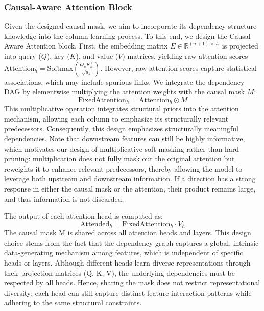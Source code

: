 \documentclass[conference]{IEEEtran}
\newcommand{\icde}[1]{{\color{black}#1}}
\newcommand{\rl}[1]{{\color{black}#1}}
\newcommand{\sydesi}[1]{{\color{black}#1}}
\newcommand{\syadd}[1]{{\color{black}#1}}
\newcommand{\syfix}[1]{{\color{black}#1}}
\newcommand{\vldb}[1]{{\color{black}#1}}
\newcommand{\syic}[1]{{\color{black}#1}}
\newcommand{\syone}[1]{{\color{black}#1}}
\begin{document}
\subsubsection{\vldb{Causal-Aware} Attention Block
}\label{sec:causal_attn_block}

\sydesi{
Given the designed causal mask, we aim to incorporate its \syic{dependency structure} knowledge into the column learning process. 
To this end, we design the \vldb{Causal-Aware} Attention block.
\rl{First, the embedding matrix $E \in \mathbb{R}^{(n+1) \times d_e}$ is projected into query ($Q$), key ($K$), and value ($V$) matrices, yielding raw attention scores $\text{Attention}_{h} = \text{Softmax}(\frac{Q_h K_h^\top}{\sqrt{d_k}})$.}
}
\sydesi{However, raw attention scores capture statistical associations, which may include spurious links. 
We integrate the \syic{dependency} DAG by elementwise multiplying the attention weights with the causal mask $M$:}
\begin{equation}
    \text{FixedAttention}_h = \text{Attention}_h \odot M
    \label{eq:masked-attn}
\end{equation}
This multiplicative operation integrates \syic{structural} priors into the attention mechanism, \sydesi{allowing each column to \syone{emphasize} its \syic{structurally relevant} predecessors. Consequently, this design emphasizes }\syic{structurally meaningful} dependencies.
\icde{
Note that downstream features can still be highly informative, which motivates our design of multiplicative soft masking rather than hard pruning: multiplication does not fully mask out the original attention but reweights it to enhance \syic{relevant} predecessors, thereby allowing the model to leverage both upstream and downstream information.
If a direction has a strong response in either the causal mask or the attention, their product remains large, and thus information is not discarded.
}

The output of each attention head is computed as:
\begin{equation}
    \text{Attended}_h = \text{FixedAttention}_h \cdot V_h
    \label{eq:attended-head}
\end{equation}
\syadd{The causal mask M is shared across all attention heads and layers. This design choice stems from the fact that the \syic{dependency} graph captures a global, intrinsic data-generating mechanism among \syfix{features}, which is independent of specific heads or layers. Although different heads learn diverse representations through their projection matrices (Q, K, V), the underlying \syic{dependencies} must be respected by all heads. Hence, sharing the mask does not restrict representational diversity; each head can still capture distinct feature interaction patterns while adhering to the same \syic{structural} constraints.}
\end{document}
